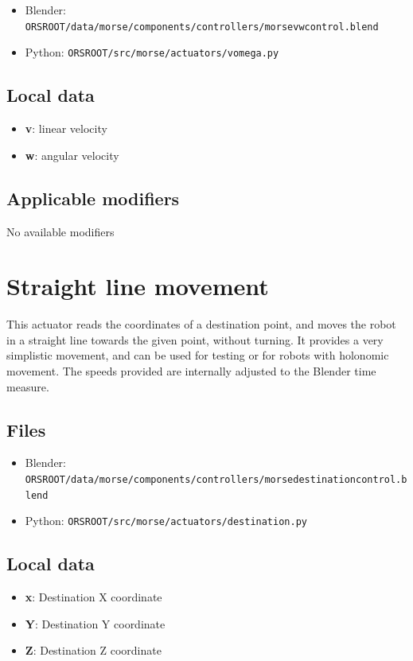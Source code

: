 \documentclass[twoside,a4paper,10pt]{report}
\newcommand{\dokutitlelevelone}[1]{\chapter{#1}}
\newcommand{\dokutitleleveltwo}[1]{\section{#1}}
\newcommand{\dokubold}[1]{\textbf{#1}}
\newcommand{\dokumonospace}[1]{\texttt{#1}}
\newcommand{\dokuitem}{\item}
\begin{document}
\begin{itemize}
\dokuitem  Blender: \dokumonospace{{\textdollar}ORS{\textunderscore}ROOT/data/morse/components/controllers/morse{\textunderscore}vw{\textunderscore}control.blend}
\dokuitem  Python: \dokumonospace{{\textdollar}ORS{\textunderscore}ROOT/src/morse/actuators/v{\textunderscore}omega.py}
\end{itemize}

\dokutitleleveltwo{Local data}
\label{a53af9dae307d714362321cf5d55d89c}%

\begin{itemize}
\dokuitem  \dokubold{v}: linear velocity
\dokuitem  \dokubold{w}: angular velocity
\end{itemize}

\dokutitleleveltwo{Applicable modifiers}
\label{e70c0c8fd69fbf29dc4de09110825004}%

No available modifiers


\dokutitlelevelone{Straight line movement}
\label{90821a70309c40fdb782ed75db5c7b9a}%
\label{6990a54322d9232390a784c5c9247dd6}%

This actuator reads the coordinates of a destination point, and moves the robot in a straight line towards the given point, without turning.
It provides a very simplistic movement, and can be used for testing or for robots with holonomic movement.
The speeds provided are internally adjusted to the Blender time measure.


\dokutitleleveltwo{Files}
\label{45b963397aa40d4a0063e0d85e4fe7a1}%

\begin{itemize}
\dokuitem  Blender: \dokumonospace{{\textdollar}ORS{\textunderscore}ROOT/data/morse/components/controllers/morse{\textunderscore}destination{\textunderscore}control.blend}
\dokuitem  Python: \dokumonospace{{\textdollar}ORS{\textunderscore}ROOT/src/morse/actuators/destination.py}
\end{itemize}

\dokutitleleveltwo{Local data}
\label{a53af9dae307d714362321cf5d55d89c}%

\begin{itemize}
\dokuitem  \dokubold{x}: Destination X coordinate
\dokuitem  \dokubold{Y}: Destination Y coordinate
\dokuitem  \dokubold{Z}: Destination Z coordinate
\end{itemize}
\end{document}
